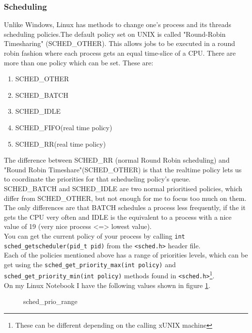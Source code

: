 \subsubsection{Scheduling}
\label{ssec:sched_policies}
Unlike Windows, Linux has methods to change one's process and its threads scheduling policies.The default policy set on UNIX
is called "Round-Robin Timesharing" (SCHED\_OTHER). This allows jobs to be executed in a round robin fashion where
each process gets an equal time-slice of a CPU. There are more than one policy which can be set.
These are:
\begin{enumerate}
	\item SCHED\_OTHER
	\item SCHED\_BATCH
	\item SCHED\_IDLE
	\item SCHED\_FIFO(real time policy)
	\item SCHED\_RR(real time policy)
\end{enumerate}
The difference between SCHED\_RR (normal Round Robin scheduling) and "Round Robin Timeshare"(SCHED\_OTHER) is that the realtime policy lets
us to coordinate the priorities for that schedueling policy's queue.\\
SCHED\_BATCH and SCHED\_IDLE are two normal prioritised policies, which differ from SCHED\_OTHER, but
not enough for me to focus too much on them.
The only differences are that BATCH schedules a process less
frequently, if the it gets the CPU very often and IDLE is the equivalent to a process with a nice value of 19
(very nice process <=> lowest value).\\
You can get the current policy of your process by calling \texttt{int sched\_getscheduler(pid\_t pid)} from the \texttt{<sched.h>} header file. 
\\
Each of the policies mentioned above has a range of priorities levels, which can be get using the \texttt{sched\_get\_priority\_max(int policy)} and \texttt{sched\_get\_priority\_min(int policy)} methods found in \texttt{<sched.h>}\footnote{These can be different depending on the calling xUNIX
machine}.\\
On my Linux Notebook I have the following values shown in figure \ref{sched_prio_range}.
\begin{figure}[!htb]
	\centering
	\caption{sched\_prio\_range} 
	\label{sched_prio_range}
\end{figure}
